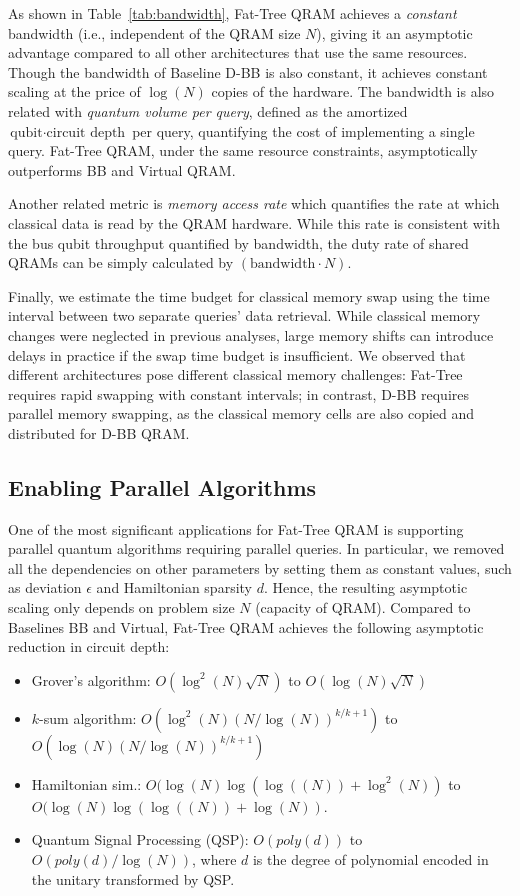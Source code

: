 As shown in Table~\ref{tab:bandwidth}, Fat-Tree QRAM achieves a \emph{constant} bandwidth (i.e., independent of the QRAM size $N$), giving it an asymptotic advantage compared to all other architectures that use the same resources. Though the bandwidth of Baseline D-BB is also constant, it achieves constant scaling at the price of $\log(N)$ copies of the hardware. The bandwidth is also related with \emph{quantum volume per query}, defined as the amortized $\textrm{qubit} \cdot \textrm{circuit depth}$ per query, quantifying the cost of implementing a single query. Fat-Tree QRAM, under the same resource constraints, asymptotically outperforms BB and Virtual QRAM.

Another related metric is \emph{memory access rate} which quantifies the rate at which classical data is read by the QRAM hardware. While this rate is consistent with the bus qubit throughput quantified by bandwidth, the duty rate of shared QRAMs can be simply calculated by $(\textrm{bandwidth} \cdot N)$. 

Finally, we estimate the time budget for classical memory swap using the time interval between two separate queries' data retrieval. While classical memory changes were neglected in previous analyses, large memory shifts can introduce delays in practice if the swap time budget is insufficient. We observed that different architectures pose different classical memory challenges: Fat-Tree requires rapid swapping with constant intervals; in contrast, D-BB requires parallel memory swapping, as the classical memory cells are also copied and distributed for D-BB QRAM. 

\subsection{Enabling Parallel Algorithms}
One of the most significant applications for Fat-Tree QRAM is supporting parallel quantum algorithms requiring parallel queries. In particular, we removed all the dependencies on other parameters by setting them as constant values, such as deviation $\epsilon$ and Hamiltonian sparsity $d$. Hence, the resulting asymptotic scaling only depends on problem size $N$ (capacity of QRAM). Compared to Baselines BB and Virtual, Fat-Tree QRAM achieves the following asymptotic reduction in circuit depth: 
\begin{itemize}
    \item Grover's algorithm: $O(\log^2(N)\sqrt{N})$ to $O(\log(N)\sqrt{N})$
    \item $k$-sum algorithm: $O(\log^2(N)(N/\log(N))^{k/k+1})$ to \newline $O(\log(N)(N/\log(N))^{k/k+1})$
    \item Hamiltonian sim.: $O(\log(N)\log(\log((N))+\log^2(N))$ to $O(\log(N)\log(\log((N))+\log(N))$.
    \item Quantum Signal Processing (QSP): $O(poly(d))$ to \\ $O(poly(d) /\log(N))$, where $d$ is the degree of polynomial encoded in the unitary transformed by QSP.
\end{itemize}

